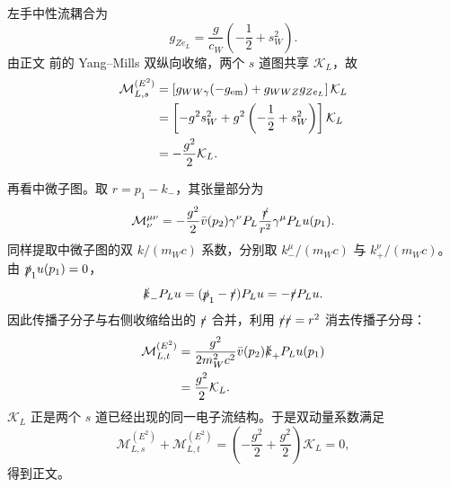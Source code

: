\begin{derivation}[左手电子通道中的高能抵消]

左手中性流耦合为
\begin{equation*}
g_{Ze_L}=\frac g{c_W}\left(-\frac12+s_W^2\right).
\end{equation*}
由正文 前的 Yang--Mills 双纵向收缩，两个 $s$ 道图共享 $\mathcal K_L$，故
\begin{align*}
\mathcal M_{L,s}^{(E^2)}
&=\left[g_{WW\gamma}(-g_{\rm em})+g_{WWZ}g_{Ze_L}\right]\mathcal K_L\\
&=\left[-g^2s_W^2+g^2\left(-\frac12+s_W^2\right)\right]\mathcal K_L\\
&=-\frac{g^2}{2}\mathcal K_L.
\end{align*}

再看中微子图。取 $r=p_1-k_-$，其张量部分为
\begin{equation*}
\mathcal M_\nu^{\mu\nu}
=-\frac{g^2}{2}\bar v(p_2)\gamma^\nu P_L
\frac{\slashed r}{r^2}\gamma^\mu P_Lu(p_1).
\end{equation*}
同样提取中微子图的双 $k/(m_Wc)$ 系数，分别取 $k_-^\mu/(m_Wc)$ 与 $k_+^\nu/(m_Wc)$。由 $\slashed p_1u(p_1)=0$，
\begin{equation*}
\slashed k_-P_Lu=(\slashed p_1-\slashed r)P_Lu
=-\slashed rP_Lu.
\end{equation*}
因此传播子分子与右侧收缩给出的 $\slashed r$ 合并，利用 $\slashed r\slashed r=r^2$ 消去传播子分母：
\begin{align*}
\mathcal M_{L,t}^{(E^2)}
&=\frac{g^2}{2m_W^2c^2}
\bar v(p_2)\slashed k_+P_Lu(p_1)\\
&=\frac{g^2}{2}\mathcal K_L.
\end{align*}
$\mathcal K_L$ 正是两个 $s$ 道已经出现的同一电子流结构。于是双动量系数满足
\begin{equation*}
\mathcal M_{L,s}^{(E^2)}+\mathcal M_{L,t}^{(E^2)}
=\left(-\frac{g^2}{2}+\frac{g^2}{2}\right)\mathcal K_L=0,
\end{equation*}
得到正文。
\end{derivation}

